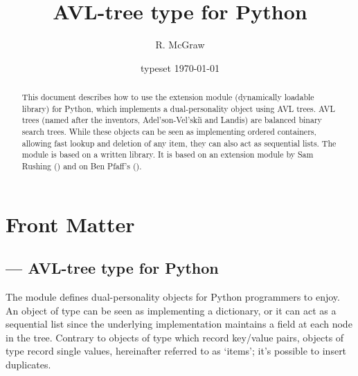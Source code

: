 \documentclass{howto}
\title{AVL-tree type for Python}
\author{R. McGraw}
\date{typeset \today}
\begin{document}
\maketitle

%
\ifhtml
\chapter*{Front Matter\label{front}}
\fi

\begin{abstract}
\noindent This document describes how to use the 
extension module (dynamically loadable library) for Python, which
implements a dual-personality object using AVL trees.  AVL trees
(named after the inventors, Adel'son-Vel'ski\u{\i} and Landis) are
balanced binary search trees.  While these objects can be seen as
implementing ordered containers, allowing fast lookup and deletion of
any item, they can also act as sequential lists.  The 
module is based on a \C{} written library.  It is based on an
extension module by Sam Rushing (\cite{Rushing}) and on Ben Pfaff's
 (\cite{Pfaff}).
\end{abstract}

\tableofcontents

\section{ ---
         AVL-tree type for Python}
% 


The  module defines dual-personality objects for Python
programmers to enjoy.  An object of type  can be seen
as implementing a dictionary, or it can act as a sequential list since
the underlying implementation maintains a  field at each
node in the tree.  Contrary to objects of type  which
record key/value pairs, objects of type  record
single values, hereinafter referred to as `items'; it's possible to
insert duplicates.
\end{document}

